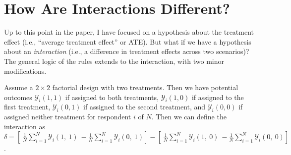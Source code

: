 \documentclass[12pt]{article}
\begin{document}
\section*{How Are Interactions Different?}

Up to this point in the paper, I have focused on a hypothesis about the treatment effect (i.e., ``average treatment effect'' or ATE). 
But what if we have a hypothesis about an \emph{interaction} (i.e., a difference in treatment effects across two scenarios)? 
The general logic of the rules extends to the interaction, with two minor modifications.

Assume a $2 \times 2$ factorial design with two treatments. 
Then we have potential outcomes $\mathcal{Y}_{i}(1, 1)$ if assigned to both treatments, $\mathcal{Y}_{i}(1,0)$ if assigned to the first treatment, $\mathcal{Y}_{i}(0,1)$ if assigned to the second treatment, and $\mathcal{Y}_{i}(0,0)$ if assigned neither treatment for respondent $i$ of $N$. 
Then we can define the interaction as $\delta = \left\lbrack \ \frac{1}{N}\sum_{i = 1}^{N}{\mathcal{Y}_{i}(1,\ 1)\ } - \frac{1}{N}\sum_{i = 1}^{N}{\mathcal{Y}_{i}(0,\ 1)} \right\rbrack - \left\lbrack \ \frac{1}{N}\sum_{i = 1}^{N}{\mathcal{Y}_{i}(1,\ 0)\ }- \frac{1}{N}\sum_{i = 1}^{N}{\mathcal{Y}_{i}(0,\ 0)} \right\rbrack$.
\end{document}
